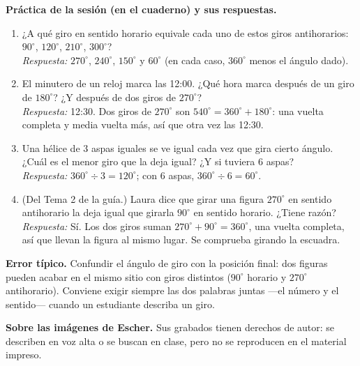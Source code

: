 \documentclass[11pt]{article}
\begin{document}
\textbf{Práctica de la sesión (en el cuaderno) y sus respuestas.}
\begin{enumerate}
  \item ¿A qué giro en sentido horario equivale cada uno de estos giros antihorarios:
    $90^\circ$, $120^\circ$, $210^\circ$, $300^\circ$?
    \\\emph{Respuesta:} $270^\circ$, $240^\circ$, $150^\circ$ y $60^\circ$
    (en cada caso, $360^\circ$ menos el ángulo dado).
  \item El minutero de un reloj marca las 12:00. ¿Qué hora marca después de un giro de
    $180^\circ$? ¿Y después de dos giros de $270^\circ$?
    \\\emph{Respuesta:} 12:30. Dos giros de $270^\circ$ son $540^\circ = 360^\circ +
    180^\circ$: una vuelta completa y media vuelta más, así que otra vez las 12:30.
  \item Una hélice de $3$ aspas iguales se ve igual cada vez que gira cierto ángulo.
    ¿Cuál es el menor giro que la deja igual? ¿Y si tuviera $6$ aspas?
    \\\emph{Respuesta:} $360^\circ \div 3 = 120^\circ$; con $6$ aspas,
    $360^\circ \div 6 = 60^\circ$.
  \item (Del Tema 2 de la guía.) Laura dice que girar una figura $270^\circ$ en sentido
    antihorario la deja igual que girarla $90^\circ$ en sentido horario. ¿Tiene razón?
    \\\emph{Respuesta:} Sí. Los dos giros suman $270^\circ + 90^\circ = 360^\circ$, una
    vuelta completa, así que llevan la figura al mismo lugar. Se comprueba girando la
    escuadra.
\end{enumerate}

\begin{nota}
\textbf{Error típico.} Confundir el ángulo de giro con la posición final: dos figuras
pueden acabar en el mismo sitio con giros distintos ($90^\circ$ horario y $270^\circ$
antihorario). Conviene exigir siempre las dos palabras juntas —el número y el sentido—
cuando un estudiante describa un giro.

\textbf{Sobre las imágenes de Escher.} Sus grabados tienen derechos de autor: se describen
en voz alta o se buscan en clase, pero no se reproducen en el material impreso.
\end{nota}
\end{document}
